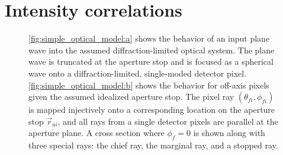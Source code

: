 \section{Intensity correlations}

\begin{figure}[!ht]
    \centering
    \caption[Simplified optical model assumed for calculating white-noise correlations]{\ref{fig:simple_optical_model:a} shows the behavior of an input plane wave into the assumed diffraction-limited optical system. The plane wave is truncated at the aperture stop and is focused as a spherical wave onto a diffraction-limited, single-moded detector pixel. \ref{fig:simple_optical_model:b} shows the behavior for off-axis pixels given the assumed idealized aperture stop. The pixel ray $(\theta_{fi}, \phi_{fi})$ is mapped injectively onto a corresponding location on the aperture stop $\vec{r}_{ai}$, and all rays from a single detector pixels are parallel at the aperture plane. A cross section where $\phi_{f} = 0$ is shown along with three special rays: the chief ray, the marginal ray, and a stopped ray.}
    \label{fig:simple_optics}
\end{figure}

